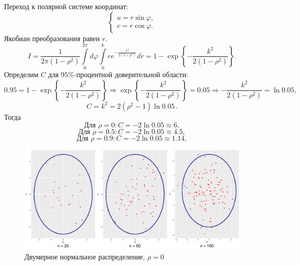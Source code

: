 \documentclass[a4paper]{article}
\begin{document}
Переход к полярной системе координат:
\begin{equation*}
    \begin{cases}
    u=r\sin{\varphi},\\
    v=r\cos{\varphi}.
    \end{cases}
\end{equation*}
Якобиан преобразования равен $r$.\\
\begin{equation*}
    I=\dfrac{1}{2\pi(1-\rho^2)}\int\limits_{0}^{2\pi}d\varphi\int\limits_{0}^{k}r e^{-\frac{r^2}{2(1-\rho^2)}}dr=1-\exp\left\{-\dfrac{k^2}{2(1-\rho^2)}\right\}.
\end{equation*}
Определим $C$ для $95\%$-процентной доверительной области:
\begin{equation*}
    0.95=1-\exp\left\{-\dfrac{k^2}{2(1-\rho^2)}\right\}\Longrightarrow \exp\left\{-\dfrac{k^2}{2(1-\rho^2)}\right\}=0.05\Longrightarrow -\dfrac{k^2}{2(1-\rho^2)}=\ln{0.05},
\end{equation*}
\begin{equation*}
    C=k^2=2(\rho^2-1)\ln{0.05}\,.
\end{equation*}
Тогда
\begin{equation*}
    \text{Для }\rho=0:C=-2\ln{0.05}\approx6,
\end{equation*}
\begin{equation*}
    \text{Для }\rho=0.5:C=-2\ln{0.05}\approx4.5,
\end{equation*}
\begin{equation*}
    \text{Для }\rho=0.9:C=-2\ln{0.05}\approx1.14,
\end{equation*}
\begin{figure}[H]
    \centering
    \includegraphics[width = \textwidth, height = 7 cm]{LabSrcs/resources/ellipse_rho_0.pdf}
    \caption{Двумерное нормальное распределение, $\rho=0$}
    \label{fig:el20}
\end{figure}
\end{document}
